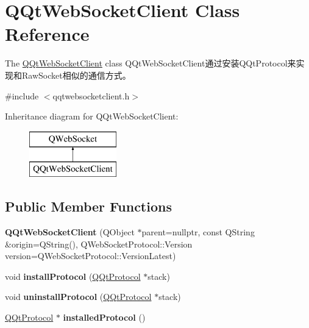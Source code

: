 \hypertarget{class_q_qt_web_socket_client}{}\section{Q\+Qt\+Web\+Socket\+Client Class Reference}
\label{class_q_qt_web_socket_client}


The \mbox{\hyperlink{class_q_qt_web_socket_client}{Q\+Qt\+Web\+Socket\+Client}} class Q\+Qt\+Web\+Socket\+Client通过安装\+Q\+Qt\+Protocol来实现和\+Raw\+Socket相似的通信方式。  




{\ttfamily \#include $<$qqtwebsocketclient.\+h$>$}

Inheritance diagram for Q\+Qt\+Web\+Socket\+Client\+:\begin{figure}[H]
\begin{center}
\leavevmode
\includegraphics[height=2.000000cm]{class_q_qt_web_socket_client}
\end{center}
\end{figure}
\subsection*{Public Member Functions}
\begin{DoxyCompactItemize}
\item 
\mbox{\label{class_q_qt_web_socket_client_aad40f4b80302a8b0204b5884ba9f815d}} 
{\bfseries Q\+Qt\+Web\+Socket\+Client} (Q\+Object $\ast$parent=nullptr, const Q\+String \&origin=Q\+String(), Q\+Web\+Socket\+Protocol\+::\+Version version=Q\+Web\+Socket\+Protocol\+::\+Version\+Latest)
\item 
\mbox{\label{class_q_qt_web_socket_client_ace8fa2235520ed6ab652fe0668d3dd97}} 
void {\bfseries install\+Protocol} (\mbox{\hyperlink{class_q_qt_protocol}{Q\+Qt\+Protocol}} $\ast$stack)
\item 
\mbox{\label{class_q_qt_web_socket_client_a2a1f33a9165d4d529d1017092d170a0d}} 
void {\bfseries uninstall\+Protocol} (\mbox{\hyperlink{class_q_qt_protocol}{Q\+Qt\+Protocol}} $\ast$stack)
\item 
\mbox{\label{class_q_qt_web_socket_client_a2f222deb8cd5ae4ee680322ef2d76360}} 
\mbox{\hyperlink{class_q_qt_protocol}{Q\+Qt\+Protocol}} $\ast$ {\bfseries installed\+Protocol} ()
\end{DoxyCompactItemize}
